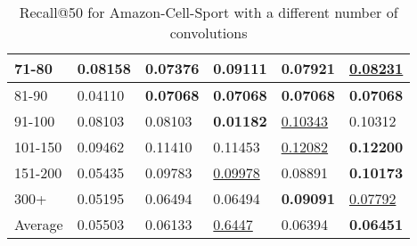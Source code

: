 \begin{table*}[]
\begin{tabular}{|l|l|l|l|l|l|}
        71-80     & 0.08158                    & 0.07376                    & \textbf{0.09111}           & 0.07921                    & \underline{0.08231}        \\ \hline
        81-90     & 0.04110                    & \textbf{0.07068}           & \textbf{0.07068}           & \textbf{0.07068}           & \textbf{0.07068}           \\ \hline
        91-100    & 0.08103                    & 0.08103                    & \textbf{0.01182}           & \underline{0.10343}        & 0.10312                    \\ \hline
        101-150   & 0.09462                    & 0.11410                    & 0.11453                    & \underline{0.12082}        & \textbf{0.12200}           \\ \hline
        151-200   & 0.05435                    & 0.09783                    & \underline{0.09978}        & 0.08891                    & \textbf{0.10173}           \\ \hline
        300+      & 0.05195                    & 0.06494                    & 0.06494                    & \textbf{0.09091}           & \underline{0.07792}        \\ \hline
        Average   & 0.05503                    & 0.06133                    & \underline{0.6447}         & 0.06394                    & \textbf{0.06451}           \\ \hline
    \end{tabular}
    \caption{Recall@50 for Amazon-Cell-Sport with a different number of convolutions}
    \label{tab:Amazon-Cell-Sport-recall-evaluation-mean}
\end{table*}
